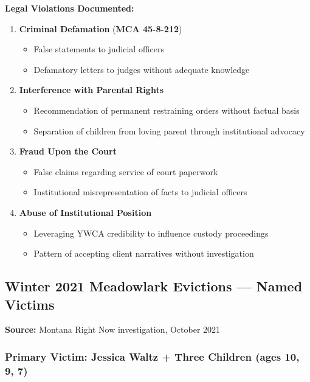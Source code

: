 \documentclass[11pt,letterpaper]{article}
\newcommand{\statref}[1]{\textbf{\color{NavyBlue}#1}}
\begin{document}
\textbf{Legal Violations Documented:}

\begin{enumerate}[leftmargin=*]
\item \textbf{Criminal Defamation} (\statref{MCA 45-8-212})
\begin{itemize}
\item False statements to judicial officers
\item Defamatory letters to judges without adequate knowledge
\end{itemize}

\item \textbf{Interference with Parental Rights}
\begin{itemize}
\item Recommendation of permanent restraining orders without factual basis
\item Separation of children from loving parent through institutional advocacy
\end{itemize}

\item \textbf{Fraud Upon the Court}
\begin{itemize}
\item False claims regarding service of court paperwork
\item Institutional misrepresentation of facts to judicial officers
\end{itemize}

\item \textbf{Abuse of Institutional Position}
\begin{itemize}
\item Leveraging YWCA credibility to influence custody proceedings
\item Pattern of accepting client narratives without investigation
\end{itemize}
\end{enumerate}

\subsection{Winter 2021 Meadowlark Evictions --- Named Victims}

\textbf{Source:} Montana Right Now investigation, October 2021

\subsubsection{Primary Victim: Jessica Waltz + Three Children (ages 10, 9, 7)}
\end{document}
